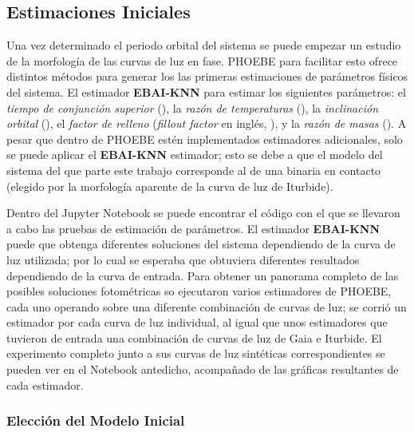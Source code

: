 \subsection{Estimaciones Iniciales}
\label{metodologia:modelocomputacional:estimacionesiniciales}

Una vez determinado el periodo orbital del sistema se puede empezar un estudio
de la morfología de las curvas de luz en fase. PHOEBE para facilitar esto ofrece
distintos métodos para generar los las primeras estimaciones de parámetros
físicos del sistema. El estimador \textbf{EBAI-KNN} para estimar los siguientes
parámetros: el \textit{tiempo de conjunción superior} (), la
\textit{razón de temperaturas} (), la \textit{inclinación
	orbital} (), el \textit{factor de relleno}
(\textit{fillout factor} en inglés, ), y la
\textit{razón de masas} (). A pesar que dentro de PHOEBE estén
implementados estimadores adicionales, solo se puede aplicar el
\textbf{EBAI-KNN} estimador; esto se debe a que el modelo del sistema del que
parte este trabajo corresponde al de una binaria en contacto (elegido por la
morfología aparente de la curva de luz de Iturbide).

Dentro del Jupyter Notebook
\href{https://github.com/KnightIV/UANL_MAPTA_PlanObservaciones/blob/main/analisis/phoebe_model/estimations/ebai-default.ipynb}{}
se puede encontrar el código con el que se llevaron a cabo las pruebas de
estimación de parámetros. El estimador \textbf{EBAI-KNN} puede que obtenga
diferentes soluciones del sistema dependiendo de la curva de luz utilizada; por
lo cual se esperaba que obtuviera diferentes resultados dependiendo de la curva
de entrada. Para obtener un panorama completo de las posibles soluciones
fotométricas so ejecutaron varios estimadores de PHOEBE, cada uno operando sobre
una diferente combinación de curvas de luz; se corrió un estimador por cada
curva de luz individual, al igual que unos estimadores que tuvieron de entrada
una combinación de curvas de luz de Gaia e Iturbide. El experimento completo
junto a sus curvas de luz sintéticas correspondientes se pueden ver en el
Notebook antedicho, acompañado de las gráficas resultantes de cada estimador.

\subsubsection{Elección del Modelo Inicial}
\label{metodologia:modelocomputacional:estimacionesiniciales:eligiendomodeloinicial}

